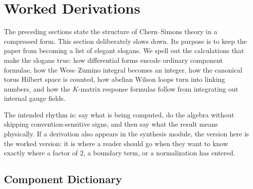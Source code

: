 
\providecommand{\dd}{\mathrm{d}}
\providecommand{\Tr}{\operatorname{Tr}}
\providecommand{\tr}{\operatorname{tr}}
\providecommand{\CS}{\operatorname{CS}}
\providecommand{\Hom}{\operatorname{Hom}}
\providecommand{\U}{\operatorname{U}}
\providecommand{\SU}{\operatorname{SU}}
\providecommand{\Lk}{\operatorname{Lk}}
\providecommand{\SLk}{\operatorname{SLk}}
\providecommand{\Lie}{\operatorname{Lie}}
\providecommand{\id}{\operatorname{id}}

\section{Worked Derivations}
\label{sec:dense-derivation-expansion}

The preceding sections state the structure of Chern--Simons theory in a compressed form. This section deliberately slows down. Its purpose is to keep the paper from becoming a list of elegant slogans. We spell out the calculations that make the slogans true: how differential forms encode ordinary component formulae, how the Wess--Zumino integral becomes an integer, how the canonical torus Hilbert space is counted, how abelian Wilson loops turn into linking numbers, and how the $K$-matrix response formulas follow from integrating out internal gauge fields.

The intended rhythm is: say what is being computed, do the algebra without skipping convention-sensitive signs, and then say what the result means physically. If a derivation also appears in the synthesis module, the version here is the worked version: it is where a reader should go when they want to know exactly where a factor of $2$, a boundary term, or a normalization has entered.


\subsection{Component Dictionary}
\label{subsec:dense-component-ff}

